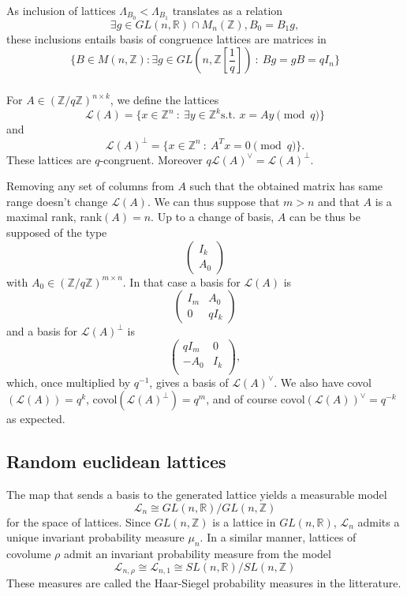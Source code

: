 \documentclass{article}
\begin{document}
As inclusion of lattices $\Lambda_{B_0} < \Lambda_{B_1}$ translates as a relation
\[\exists g \in  GL(n,\mathbb R) \cap M_n(\mathbb Z) , B_0 = B_1g , \] 
these inclusions entails basis of congruence lattices are matrices in 
\[\{B\in M(n,\mathbb Z) : \exists g\in GL(n,\mathbb Z[\frac{1}{q}] ) \ : \ Bg = gB = qI_n \}\]
   
\subsubsection{}

For $A\in (\mathbb Z/q\mathbb Z)^{n\times k}$, we define the lattices
\[\mathcal L(A) = \{x\in\mathbb Z^{n} \ : \ \exists y\in\mathbb Z^k \text{s.t. } x = Ay \pmod{q} \}\]
and
\[\mathcal L(A)^\perp = \{x\in\mathbb Z^{n} \ :\ A^{T}x = 0 \pmod{q} \}.\]
These lattices are $q$-congruent. Moreover $q\mathcal L(A)^\vee = \mathcal L(A)^\perp$.   

Removing any set of columns from $A$ such that the obtained matrix has same range doesn't change $\mathcal L(A)$. We can thus suppose that $m>n$ and that $A$ is a maximal rank, rank$(A)=n$. Up to a change of basis, $A$ can be thus be supposed of the type 
\[\begin{pmatrix}
I_k \\
A_0
\end{pmatrix}\]
with $A_0\in (\mathbb Z/q\mathbb Z)^{m\times n}$. In that case a basis for $\mathcal L(A)$ is 
\[
\begin{pmatrix}
  I_m & A_0 \\ 0 & qI_k 
\end{pmatrix}
\]
and a basis for $\mathcal L(A)^\perp$ is 
\[
\begin{pmatrix}
  q I_m & 0 \\  - A_0 & I_k \\
\end{pmatrix},
\]
which, once multiplied by $q^{-1}$, gives a basis of $\mathcal L(A)^\vee$. We also have covol$(\mathcal L(A))=q^{k}$, covol$(\mathcal L(A)^\perp)=q^{m}$, and of course covol$(\mathcal L(A))^\vee=q^{-k}$ as expected.

\subsection{Random euclidean lattices} %
The map that sends a basis to the generated lattice yields a measurable model 
\[\mathcal L_n \cong  GL(n,\mathbb R) / GL(n,\mathbb Z) \]
for the space of lattices. Since $GL(n,\mathbb Z)$ is a lattice in $GL(n,\mathbb R)$, $\mathcal L_n$ admits a unique invariant probability measure $\mu_n$. In a similar manner, lattices of covolume $\rho$ admit an invariant probability measure from the model 
\[\mathcal L_{n,\rho} \cong \mathcal L_{n,1}\cong SL(n,\mathbb R) / SL(n,\mathbb Z)\]
These measures are called the Haar-Siegel probability measures in the litterature.
\end{document}
